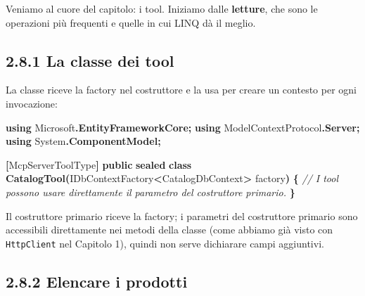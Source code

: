 \documentclass[
  italian,
  10pt,
]{book}
\newenvironment{Shaded}{\begin{snugshade}}{\end{snugshade}}
\newcommand{\CommentTok}[1]{\textcolor[rgb]{0.56,0.35,0.01}{\textit{#1}}}
\newcommand{\FunctionTok}[1]{\textcolor[rgb]{0.13,0.29,0.53}{\textbf{#1}}}
\newcommand{\KeywordTok}[1]{\textcolor[rgb]{0.13,0.29,0.53}{\textbf{#1}}}
\newcommand{\NormalTok}[1]{#1}
\newcommand{\OperatorTok}[1]{\textcolor[rgb]{0.81,0.36,0.00}{\textbf{#1}}}
\begin{document}
Veniamo al cuore del capitolo: i tool. Iniziamo dalle \textbf{letture},
che sono le operazioni più frequenti e quelle in cui LINQ dà il meglio.

\subsection{2.8.1 La classe dei tool}\label{la-classe-dei-tool}

La classe riceve la factory nel costruttore e la usa per creare un
contesto per ogni invocazione:

\begin{Shaded}
\begin{Highlighting}[]
\KeywordTok{using}\NormalTok{ Microsoft}\OperatorTok{.}\FunctionTok{EntityFrameworkCore}\OperatorTok{;}
\KeywordTok{using}\NormalTok{ ModelContextProtocol}\OperatorTok{.}\FunctionTok{Server}\OperatorTok{;}
\KeywordTok{using}\NormalTok{ System}\OperatorTok{.}\FunctionTok{ComponentModel}\OperatorTok{;}

\OperatorTok{[}\NormalTok{McpServerToolType}\OperatorTok{]}
\KeywordTok{public} \KeywordTok{sealed} \KeywordTok{class} \FunctionTok{CatalogTool}\OperatorTok{(}\NormalTok{IDbContextFactory}\OperatorTok{\textless{}}\NormalTok{CatalogDbContext}\OperatorTok{\textgreater{}}\NormalTok{ factory}\OperatorTok{)}
\OperatorTok{\{}
    \CommentTok{// I tool possono usare direttamente il parametro del costruttore primario.}
\OperatorTok{\}}
\end{Highlighting}
\end{Shaded}

Il costruttore primario riceve la factory; i parametri del costruttore
primario sono accessibili direttamente nei metodi della classe (come
abbiamo già visto con \texttt{HttpClient} nel Capitolo 1), quindi non
serve dichiarare campi aggiuntivi.

\subsection{2.8.2 Elencare i prodotti}\label{elencare-i-prodotti}
\end{document}

